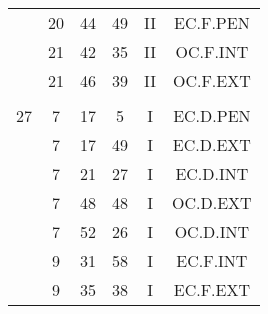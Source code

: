 \documentclass[12pt, a4paper]{article}
\begin{document}
\begin{multicols}{3}
{\begin{tabular}{c c c c c c}
	 	 	 	 & 20 & 44 & 49 & II & EC.F.PEN\\%
	 	 	 	 & 21 & 42 & 35 & II & OC.F.INT\\%
	 	 	 	 & 21 & 46 & 39 & II & OC.F.EXT\\%
	 	 	 	 & & & & & \\%
	 	 	 	27 & 7 & 17 & 5 & I & EC.D.PEN\\%
	 	 	 	 & 7 & 17 & 49 & I & EC.D.EXT\\%
	 	 	 	 & 7 & 21 & 27 & I & EC.D.INT\\%
	 	 	 	 & 7 & 48 & 48 & I & OC.D.EXT\\%
	 	 	 	 & 7 & 52 & 26 & I & OC.D.INT\\%
	 	 	 	 & 9 & 31 & 58 & I & EC.F.INT\\%
	 	 	 	 & 9 & 35 & 38 & I & EC.F.EXT\\%
	 	 \end{tabular}
 	}
\end{multicols}
\end{document}
